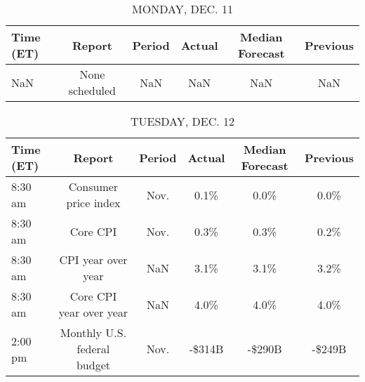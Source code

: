 \documentclass{article}%
\begin{document}
%
\normalsize%


\begin{table}[htbp]%
\caption{MONDAY, DEC. 11}%
\centering%
\begin{adjustbox}{width=1\textwidth}%
\begin{tabular}{lccccc}
\toprule
Time (ET) &         Report & Period & Actual & Median Forecast & Previous \\
\midrule
      NaN & None scheduled &    NaN &    NaN &             NaN &      NaN \\
\bottomrule
\end{tabular}
%
\end{adjustbox}%
\end{table}

%


\begin{table}[htbp]%
\caption{TUESDAY, DEC. 12}%
\centering%
\begin{adjustbox}{width=1\textwidth}%
\begin{tabular}{lccccc}
\toprule
Time (ET) &                      Report & Period & Actual & Median Forecast & Previous \\
\midrule
  8:30 am &        Consumer price index &   Nov. &   0.1\% &            0.0\% &     0.0\% \\
  8:30 am &                    Core CPI &   Nov. &   0.3\% &            0.3\% &     0.2\% \\
  8:30 am &          CPI year over year &    NaN &   3.1\% &            3.1\% &     3.2\% \\
  8:30 am &     Core CPI year over year &    NaN &   4.0\% &            4.0\% &     4.0\% \\
  2:00 pm & Monthly U.S. federal budget &   Nov. & -\$314B &          -\$290B &   -\$249B \\
\bottomrule
\end{tabular}
%
\end{adjustbox}%
\end{table}

%
\end{document}
